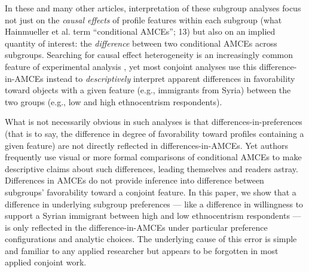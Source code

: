 \documentclass[a4paper,12pt]{article}\usepackage[]{graphicx}\usepackage[]{color}
\begin{document}
In these and many other articles, interpretation of these subgroup analyses focus not just on the \textit{causal effects} of profile features within each subgroup (what Hainmueller et al. term ``conditional AMCEs''; 13) but also on an implied quantity of interest: the \textit{difference} between two conditional AMCEs across subgroups. Searching for causal effect heterogeneity is an increasingly common feature of experimental analysis \citep{GreenKern2012, RatkovicTingley2017, GrimmerMessingWestwood2017}, yet most conjoint analyses use this difference-in-AMCEs instead to \textit{descriptively} interpret apparent differences in favorability toward objects with a given feature (e.g., immigrants from Syria) between the two groups (e.g., low and high ethnocentrism respondents).

What is not necessarily obvious in such analyses is that differences-in-preferences (that is to say, the difference in degree of favorability toward profiles containing a given feature) are not directly reflected in differences-in-AMCEs. Yet authors frequently use visual or more formal comparisons of conditional AMCEs to make descriptive claims about such differences, leading themselves and readers astray. Differences in AMCEs do not provide inference into difference between subgroups' favorability toward a conjoint feature. In this paper, we show that a difference in underlying subgroup preferences --- like a difference in willingness to support a Syrian immigrant between high and low ethnocentrism respondents --- is only reflected in the difference-in-AMCEs under particular preference configurations and analytic choices. The underlying cause of this error is simple and familiar to any applied researcher but appears to be forgotten in most applied conjoint work.
\end{document}
